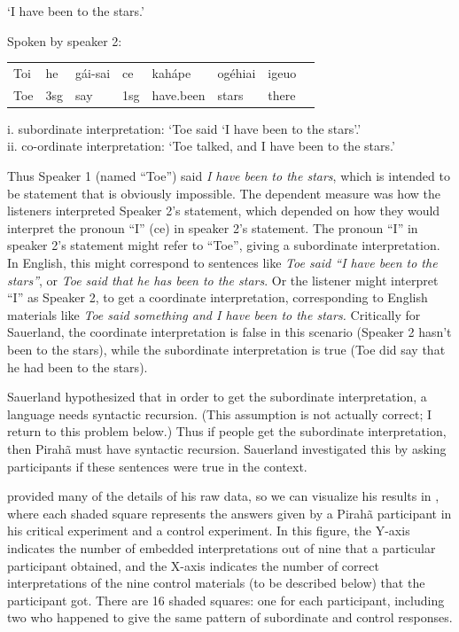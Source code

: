 \documentclass{article}
\begin{document}
`I have been to the stars.'

\ex \label{sauerland_ex2} Spoken by speaker 2:\\
\begin{tabular}{@{}l l l l l l l l}
Toi & he & gái-sai & ce & kahápe & ogéhiai & igeuo \\
Toe & 3sg & say & 1sg & have.been & stars & there\\
\end{tabular}


i. subordinate interpretation: `Toe said ‘I have been to the stars’.'\\
ii. co-ordinate interpretation: `Toe talked, and I have been to the stars.'
\zl

Thus Speaker 1 (named ``Toe'') said \textit{I have been to the stars}, which is intended to be
statement that is obviously impossible. The dependent measure was how the listeners interpreted
Speaker 2's statement, which depended on how they would interpret the pronoun ``I'' (ce) in speaker
2’s statement. The pronoun ``I'' in speaker 2’s statement might refer to ``Toe'', giving  a
subordinate interpretation. In English, this might correspond to sentences like \textit{Toe said ``I
  have been to the stars''}, or \textit{Toe said that he has been to the stars}. Or the listener
might interpret ``I'' as Speaker 2, to get a coordinate interpretation, corresponding to English materials like \textit{Toe said something and I have been to the stars.}  Critically for Sauerland, the coordinate interpretation is false in this scenario (Speaker 2 hasn’t been to the stars), while the subordinate interpretation is true (Toe did say that he had been to the stars).

Sauerland hypothesized that in order to get the subordinate interpretation, a language needs syntactic recursion. (This assumption is not actually correct; I return to this problem below.) Thus if people get the subordinate interpretation, then Pirahã must have syntactic recursion. Sauerland investigated this by asking participants if these sentences were true in the context. 

\citet{sauerland2018false} provided many of the details of his raw data, so we can visualize his results in , where each shaded square represents the answers given by a Pirahã participant in his critical experiment and a control experiment. In this figure, the Y-axis indicates the number of embedded interpretations out of nine that a particular participant obtained, and the X-axis indicates the number of correct interpretations of the nine control materials (to be described below) that the participant got. There are 16 shaded squares: one for each participant, including two who happened to give the same pattern of subordinate and control responses.
\end{document}

